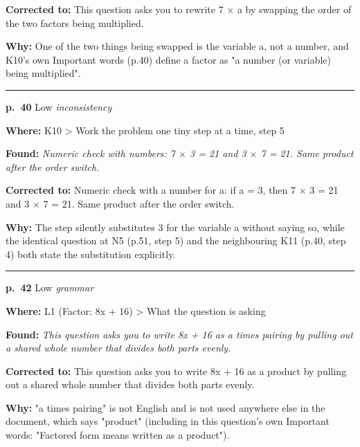 \documentclass[11pt]{article}
\newcommand{\sevlow}[1]{\textcolor{black!55}{#1}}
\begin{document}
\noindent\textbf{Corrected to: }This question asks you to rewrite 7 $\times$ a by swapping the order of the two factors being multiplied.\par
\noindent\textbf{Why: }One of the two things being swapped is the variable a, not a number, and K10's own Important words (p.40) define a factor as "a number (or variable) being multiplied".\par\vspace{4pt}
\noindent\rule{\textwidth}{0.4pt}\par\nobreak\vspace{2pt}
\noindent\textbf{p.~40} \quad \sevlow{Low} \quad \textit{inconsistency}\par
\noindent\textbf{Where: }K10 > Work the problem one tiny step at a time, step 5\par
\noindent\textbf{Found: }\textit{Numeric check with numbers: 7 $\times$ 3 = 21 and 3 $\times$ 7 = 21. Same product after the order switch.}\par
\noindent\textbf{Corrected to: }Numeric check with a number for a: if a = 3, then 7 $\times$ 3 = 21 and 3 $\times$ 7 = 21. Same product after the order switch.\par
\noindent\textbf{Why: }The step silently substitutes 3 for the variable a without saying so, while the identical question at N5 (p.51, step 5) and the neighbouring K11 (p.40, step 4) both state the substitution explicitly.\par\vspace{4pt}
\noindent\rule{\textwidth}{0.4pt}\par\nobreak\vspace{2pt}
\noindent\textbf{p.~42} \quad \sevlow{Low} \quad \textit{grammar}\par
\noindent\textbf{Where: }L1 (Factor: 8x + 16) > What the question is asking\par
\noindent\textbf{Found: }\textit{This question asks you to write 8x + 16 as a times pairing by pulling out a shared whole number that divides both parts evenly.}\par
\noindent\textbf{Corrected to: }This question asks you to write 8x + 16 as a product by pulling out a shared whole number that divides both parts evenly.\par
\noindent\textbf{Why: }"a times pairing" is not English and is not used anywhere else in the document, which says "product" (including in this question's own Important words: "Factored form means written as a product").\par\vspace{4pt}
\end{document}
